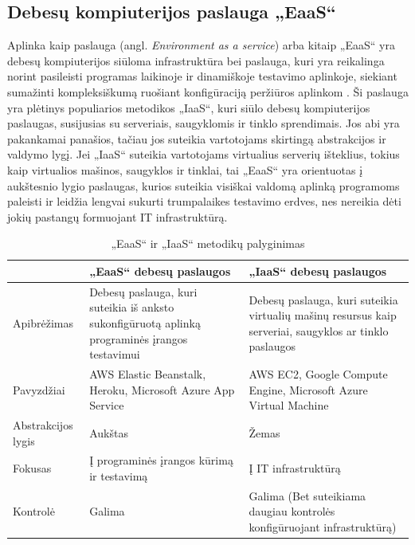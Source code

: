 \documentclass{VUMIFPSkursinis}
\begin{document}
\subsection{Debesų kompiuterijos paslauga „EaaS“}


Aplinka kaip paslauga (angl. \textit{Environment as a service}) arba kitaip 
„EaaS“ yra debesų kompiuterijos siūloma infrastruktūra bei paslauga, kuri yra reikalinga norint pasileisti programas laikinoje ir dinamiškoje testavimo aplinkoje, siekiant sumažinti kompleksiškumą ruošiant konfigūraciją peržiūros aplinkom \cite{SaltTryliktas}. Ši paslauga yra plėtinys populiarios metodikos „IaaS“, kuri siūlo debesų kompiuterijos paslaugas, susijusias su serveriais, saugyklomis ir tinklo sprendimais. Jos abi yra pakankamai panašios, tačiau jos suteikia vartotojams skirtingą abstrakcijos ir valdymo lygį. Jei „IaaS“ suteikia vartotojams virtualius serverių išteklius, tokius kaip virtualios mašinos, saugyklos ir tinklai, tai „EaaS“ yra orientuotas į aukštesnio lygio paslaugas, kurios suteikia visiškai valdomą aplinką programoms paleisti ir leidžia lengvai sukurti trumpalaikes testavimo erdves, nes nereikia dėti jokių pastangų formuojant IT infrastruktūrą. 

\begin{table}[H]\footnotesize
  \centering
  \caption{„EaaS“ ir „IaaS“ metodikų palyginimas}
  {\begin{tabular}{|l|p{55mm}|p{55mm}|} \hline
     & „EaaS“ debesų paslaugos & „IaaS“ debesų paslaugos \\
    \hline
    Apibrėžimas & Debesų paslauga, kuri suteikia iš anksto sukonfigūruotą aplinką programinės įrangos testavimui & Debesų paslauga, kuri suteikia virtualių mašinų resursus kaip serveriai, saugyklos ar tinklo paslaugos      \\
    \hline
    Pavyzdžiai & AWS Elastic Beanstalk, Heroku, Microsoft Azure App Service & AWS EC2, Google Compute Engine, Microsoft Azure Virtual Machine       \\
    \hline
    Abstrakcijos lygis & Aukštas & Žemas       \\
    \hline
    Fokusas  & Į programinės įrangos kūrimą ir testavimą    & Į IT infrastruktūrą \\
    \hline
    Kontrolė  & Galima & Galima (Bet suteikiama daugiau kontrolės konfigūruojant infrastruktūrą) \\
    \hline
  \end{tabular}}
  \label{tab:table example}
\end{table}
\end{document}
